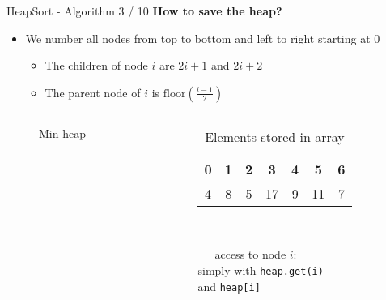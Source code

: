 \documentclass[notes=hide,pdftex,14pt]{beamer}
\begin{document}

\begin{frame}{HeapSort - Algorithm 3 / 10}
  \textbf{How to save the heap?}\\[0.25em]
  \begin{itemize}
    \item
      We number all nodes from top to bottom and left to right starting at
      {\color{Mittel-Blau}0}
      \begin{itemize}
        \item
          The children of node {\color{Mittel-Blau}$i$} are
          {\color{Mittel-Blau}$2i + 1$} and {\color{Mittel-Blau}$2i + 2$}
        \item
          The parent node of {\color{Mittel-Blau}$i$} is
          {\color{Mittel-Blau}$\mathrm{floor}\left(\frac{i-1}{2}\right)$}
      \end{itemize}
  \end{itemize}%
\vspace*{-2.5em}%
\begin{columns}%
\begin{column}{0.5\textwidth}
      \begin{figure}[!h]%
        \begin{adjustbox}{width=\linewidth}
        \end{adjustbox}
        \vspace*{-1.5em}%
        \caption{Min heap}%
        \label{fig:minheap_numbered}%
      \end{figure}%
    \end{column}
    \begin{column}{0.6\textwidth}
      \begin{table}[!h]
        \caption{Elements stored in array}
        \label{tab:minheap_numbered}
        \begin{tabular}{ccccccc}
          {\color{Greenb}0}&
          {\color{Greenb}1}&
          {\color{Greenb}2}&
          {\color{Greenb}3}&
          {\color{Greenb}4}&
          {\color{Greenb}5}&
          {\color{Greenb}6}\\
          \hline
          \multicolumn{1}{|c}{4}&%
          \multicolumn{1}{|c}{8}&%
          \multicolumn{1}{|c}{5}&%
          \multicolumn{1}{|c}{17}&%
          \multicolumn{1}{|c}{9}&%
          \multicolumn{1}{|c}{11}&%
          \multicolumn{1}{|c|}{7}\\
          \hline
        \end{tabular}\\
      \end{table}
       \ \ \ access to node $i$:\\
       \qquad{}  simply with \texttt{heap.get(i)}\\
       \qquad{} and \texttt{heap[i]}
    \end{column}
  \end{columns}
\end{frame}
\end{document}
